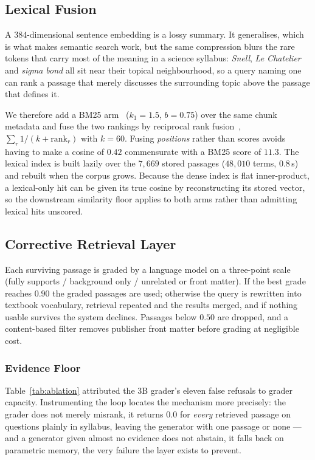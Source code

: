 \documentclass[conference]{IEEEtran}
\begin{document}
\subsection{Lexical Fusion}
\label{sec:hybrid}
A $384$-dimensional sentence embedding is a lossy summary. It generalises, which
is what makes semantic search work, but the same compression blurs the rare
tokens that carry most of the meaning in a science syllabus: \emph{Snell},
\emph{Le Chatelier} and \emph{sigma bond} all sit near their topical
neighbourhood, so a query naming one can rank a passage that merely discusses
the surrounding topic above the passage that defines it.

We therefore add a BM25 arm~\cite{robertson2009} ($k_1=1.5$, $b=0.75$) over the
same chunk metadata and fuse the two rankings by reciprocal rank
fusion~\cite{cormack2009}, $\sum_r 1/(k + \text{rank}_r)$ with $k=60$. Fusing
\emph{positions} rather than scores avoids having to make a cosine of $0.42$
commensurate with a BM25 score of $11.3$. The lexical index is built lazily over
the $7{,}669$ stored passages ($48{,}010$ terms, $0.8$\,s) and rebuilt when the
corpus grows. Because the dense index is flat inner-product, a lexical-only hit
can be given its true cosine by reconstructing its stored vector, so the
downstream similarity floor applies to both arms rather than admitting lexical
hits unscored.

\subsection{Corrective Retrieval Layer}
\label{sec:crag}
Each surviving passage is graded by a language model on a three-point scale
(fully supports / background only / unrelated or front matter). If the best
grade reaches $0.90$ the graded passages are used; otherwise the query is
rewritten into textbook vocabulary, retrieval repeated and the results merged,
and if nothing usable survives the system declines. Passages below $0.50$ are
dropped, and a content-based filter removes publisher front matter before
grading at negligible cost.

\subsubsection{Evidence Floor}
\label{sec:floor}
Table~\ref{tab:ablation} attributed the $3$B grader's eleven false refusals to
grader capacity. Instrumenting the loop locates the mechanism more precisely:
the grader does not merely misrank, it returns $0.0$ for \emph{every} retrieved
passage on questions plainly in syllabus, leaving the generator with one passage
or none --- and a generator given almost no evidence does not abstain, it falls
back on parametric memory, the very failure the layer exists to prevent.
\end{document}
